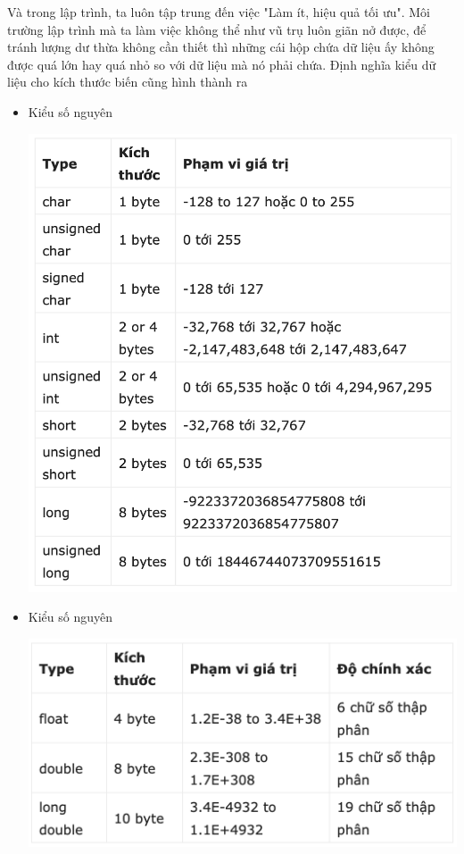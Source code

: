 \documentclass[12pt,a4paper]{article}
\begin{document}
Và trong lập trình, ta luôn tập trung đến việc "Làm ít, hiệu quả tối ưu". Môi trường lập trình mà ta làm việc không thể như vũ trụ luôn giãn nở được, để tránh lượng dư thừa không cần thiết thì những cái hộp chứa dữ liệu ấy không được quá lớn hay quá nhỏ so với dữ liệu mà nó phải chứa. Định nghĩa kiểu dữ liệu cho kích thước biến cũng hình thành ra
\begin{center}
\begin{itemize}
	\item Kiểu số nguyên
\begin{center}
\includegraphics[scale=0.55]{kieusonguyen.png}
\end{center}
	\item Kiểu số nguyên
\begin{center}
\includegraphics[scale=0.7]{kieusothuc}
\end{center}


\end{itemize}
\end{center}
\end{document}
